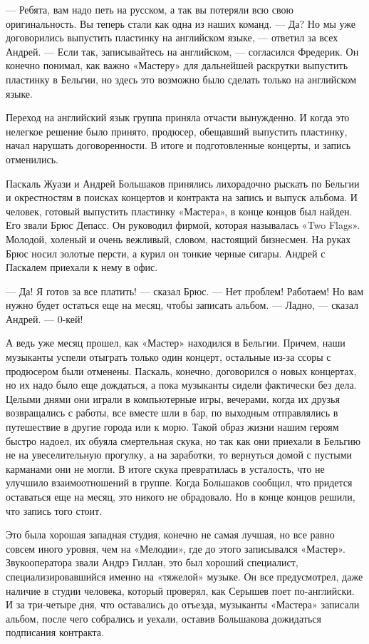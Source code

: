 \documentclass[10pt, twoside]{book}
\begin{document}
— Ребята, вам надо петь на русском, а так вы потеряли всю свою оригинальность. Вы теперь стали как одна из наших команд.
— Да? Но мы уже договорились выпустить пластинку на английском языке, — ответил за всех Андрей.
— Если так, записывайтесь на английском, — согласился Фредерик. Он конечно понимал, как важно «Мастеру» для дальнейшей
раскрутки выпустить пластинку в Бельгии, но здесь это возможно было сделать только на английском языке.

Переход на английский язык группа приняла отчасти вынужденно. И когда это нелегкое решение было принято, продюсер,
обещавший выпустить пластинку, начал нарушать договоренности. В итоге и подготовленные концерты, и запись отменились.

Паскаль Жуази и Андрей Большаков принялись лихорадочно рыскать по Бельгии и окрестностям в поисках концертов и контракта
на запись и выпуск альбома. И человек, готовый выпустить пластинку «Мастера», в конце концов был найден. Его звали Брюс
Депасс. Он руководил фирмой, которая называлась «Two Flags». Молодой, холеный и очень вежливый, словом, настоящий
бизнесмен. На руках Брюс носил золотые персти, а курил он тонкие черные сигары. Андрей с Паскалем приехали к нему в
офис.

— Да! Я готов за все платить! — сказал Брюс. — Нет проблем! Работаем! Но вам нужно будет остаться еще на месяц, чтобы
записать альбом.
— Ладно, — сказал Андрей. — 0-кей!

А ведь уже месяц прошел, как «Мастер» находился в Бельгии. Причем, наши музыканты успели отыграть только один концерт,
остальные из-за ссоры с продюсером были отменены. Паскаль, конечно, договорился о новых концертах, но их надо было еще
дождаться, а пока музыканты сидели фактически без дела. Целыми днями они играли в компьютерные игры, вечерами, когда их
друзья возвращались с работы, все вместе шли в бар, по выходным отправлялись в путешествие в другие города или к морю.
Такой образ жизни нашим героям быстро надоел, их обуяла смертельная скука, но так как они приехали в Бельгию не на
увеселительную прогулку, а на заработки, то вернуться домой с пустыми карманами они не могли. В итоге скука превратилась
в усталость, что не улучшило взаимоотношений в группе. Когда Большаков сообщил, что придется оставаться еще на месяц,
это никого не обрадовало. Но в конце концов решили, что запись того стоит.

Это была хорошая западная студия, конечно не самая лучшая, но все равно совсем иного уровня, чем на «Мелодии», где до
этого записывался «Мастер». Звукооператора звали Андрэ Гиллан, это был хороший специалист, специализировавшийся именно
на «тяжелой» музыке. Он все предусмотрел, даже наличие в студии человека, который проверял, как Серышев поет
по-английски. И за три-четыре дня, что оставались до отъезда, музыканты «Мастера» записали альбом, после чего собрались
и уехали, оставив Большакова дожидаться подписания контракта.
\end{document}
